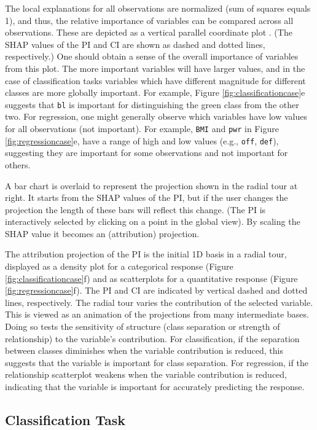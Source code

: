 \documentclass[
]{jss}
\begin{document}
The local explanations for all observations are normalized (sum of squares equals 1), and thus, the relative importance of variables can be compared across all observations. These are depicted as a vertical parallel coordinate plot \citep{ocagne_coordonnees_1885}. (The SHAP values of the PI and CI are shown as dashed and dotted lines, respectively.) One should obtain a sense of the overall importance of variables from this plot. The more important variables will have larger values, and in the case of classification tasks variables which have different magnitude for different classes are more globally important. For example, Figure \ref{fig:classificationcase}e suggests that \texttt{bl} is important for distinguishing the green class from the other two. For regression, one might generally observe which variables have low values for all observations (not important). For example, \texttt{BMI} and \texttt{pwr} in Figure \ref{fig:regressioncase}e, have a range of high and low values (e.g., \texttt{off}, \texttt{def}), suggesting they are important for some observations and not important for others.

A bar chart is overlaid to represent the projection shown in the radial tour at right. It starts from the SHAP values of the PI, but if the user changes the projection the length of these bars will reflect this change. (The PI is interactively selected by clicking on a point in the global view). By scaling the SHAP value it becomes an (attribution) projection.

The attribution projection of the PI is the initial 1D basis in a radial tour, displayed as a density plot for a categorical response (Figure \ref{fig:classificationcase}f) and as scatterplots for a quantitative response (Figure \ref{fig:regressioncase}f). The PI and CI are indicated by vertical dashed and dotted lines, respectively. The radial tour varies the contribution of the selected variable. This is viewed as an animation of the projections from many intermediate bases. Doing so tests the sensitivity of structure (class separation or strength of relationship) to the variable's contribution. For classification, if the separation between classes diminishes when the variable contribution is reduced, this suggests that the variable is important for class separation. For regression, if the relationship scatterplot weakens when the variable contribution is reduced, indicating that the variable is important for accurately predicting the response.

\hypertarget{classification-task}{%
\subsection{Classification Task}\label{classification-task}}
\end{document}
